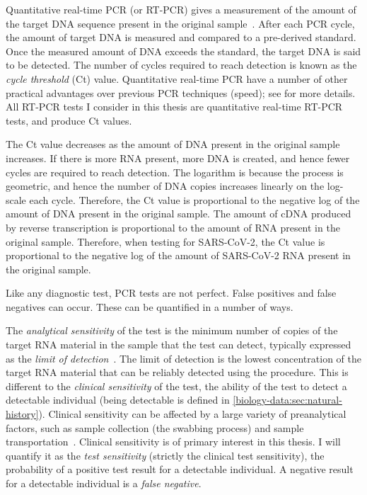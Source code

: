 \documentclass[thesis.tex]{subfiles}
\begin{document}
Quantitative real-time PCR (or RT-PCR) gives a measurement of the amount of the target DNA sequence present in the original sample~\autocite{yangPCRdiagnostics}.
After each PCR cycle, the amount of target DNA is measured and compared to a pre-derived standard.
Once the measured amount of DNA exceeds the standard, the target DNA is said to be detected.
The number of cycles required to reach detection is known as the \emph{cycle threshold} (Ct) value.
Quantitative real-time PCR have a number of other practical advantages over previous PCR techniques (\eg speed); see \textcite{yangPCRdiagnostics,valasekPower} for more details.
All RT-PCR tests I consider in this thesis are quantitative real-time RT-PCR tests, and produce Ct values.

The Ct value decreases as the amount of DNA present in the original sample increases.
If there is more RNA present, more DNA is created, and hence fewer cycles are required to reach detection.
The logarithm is because the process is geometric, and hence the number of DNA copies increases linearly on the log-scale each cycle.
Therefore, the Ct value is proportional to the negative log of the amount of DNA present in the original sample.
The amount of cDNA produced by reverse transcription is proportional to the amount of RNA present in the original sample.
Therefore, when testing for SARS-CoV-2, the Ct value is proportional to the negative log of the amount of SARS-CoV-2 RNA present in the original sample.

Like any diagnostic test, PCR tests are not perfect.
False positives and false negatives can occur.
These can be quantified in a number of ways.

The \emph{analytical sensitivity} of the test is the minimum number of copies of the target RNA material in the sample that the test can detect, typically expressed as the \emph{limit of detection}~\autocite{bustinMIQE}.
The limit of detection is the lowest concentration of the target RNA material that can be reliably detected using the procedure.
This is different to the \emph{clinical sensitivity} of the test, the ability of the test to detect a detectable individual (being detectable is defined in \cref{biology-data:sec:natural-history}).
Clinical sensitivity can be affected by a large variety of preanalytical factors, such as sample collection (\ie the swabbing process) and sample transportation~\autocite{lippiPotential}.
Clinical sensitivity is of primary interest in this thesis.
I will quantify it as the \emph{test sensitivity} (strictly the clinical test sensitivity), the probability of a positive test result for a detectable individual.
A negative result for a detectable individual is a \emph{false negative}.
\end{document}
